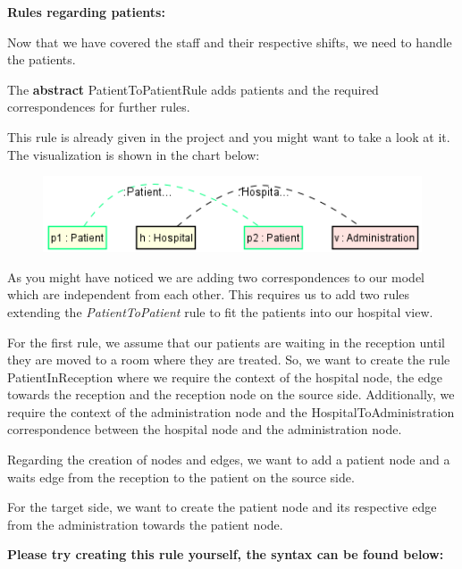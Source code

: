 \clearpage

\textbf{Rules regarding patients:}

Now that we have covered the staff and their respective shifts, we need to handle the patients. 

The \textbf{abstract} \textsf{PatientToPatientRule} adds patients and the required correspondences for further rules.

This rule is already given in the project and you might want to take a look at it. The visualization is shown in the chart below:

\begin{figure}[h]
    \centering
    \includegraphics[scale=0.65 ]{pictures/patientToPatient.png}
    \caption{}
    \label{PatientToPatientRule}
\end{figure}

As you might have noticed we are adding two correspondences to our model which are independent from each other. This requires us to add two rules extending the \textsf{\textit{PatientToPatient}} rule to fit the patients into our hospital view.

For the first rule, we assume that our patients are waiting in the reception until they are moved to a room where they are treated. So, we want to create the rule \textsf{PatientInReception} where we require the context of the hospital node, the edge towards the reception and the reception node on the source side. Additionally, we require the context of the administration node and the \textsf{HospitalToAdministration} correspondence between the hospital node and the administration node. 

Regarding the creation of nodes and edges, we want to add a patient node and a \textsf{waits} edge from the reception to the patient on the source side.

For the target side, we want to create the patient node and its respective edge from the administration towards the patient node.\newline

\textbf{Please try creating this rule yourself, the syntax can be found below:}\newline

